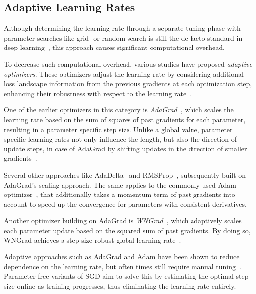 \documentclass[runningheads]{llncs}
\begin{document}
\subsection{Adaptive Learning Rates}

Although determining the learning rate through a separate tuning phase with parameter searches like grid- or random-search is still the de facto standard in deep learning~\cite{defazioLearningRateFreeLearningDAdaptation2023a}, this approach causes significant computational overhead.

To decrease such computational overhead, various studies have proposed \textit{adaptive optimizers}.
These optimizers adjust the learning rate by considering additional loss landscape information from the previous gradients at each optimization step, enhancing their robustness with respect to the learning rate~\cite{duchiAdaptiveSubgradientMethods2011}.

One of the earlier optimizers in this category is \textit{AdaGrad}~\cite{duchiAdaptiveSubgradientMethods2011}, which scales the learning rate based on the sum of squares of past gradients for each parameter, resulting in a parameter specific step size.
Unlike a global value, parameter specific learning rates not only influence the length, but also the direction of update steps, in case of AdaGrad by shifting updates in the direction of smaller gradients~\cite{wuWNGradLearnLearning2020}. %

Several other approaches like AdaDelta~\cite{zeilerADADELTAAdaptiveLearning2012a} and RMSProp~\cite{tielemanLecture5rmspropDivide2012}, subsequently built on AdaGrad's scaling approach.
The same applies to the commonly used Adam optimizer~\cite{kingmaAdamMethodStochastic2017b}, that additionally takes a momentum term of past gradients
into account to speed up the convergence for parameters with consistent derivatives.

Another optimizer building on AdaGrad is \textit{WNGrad}~\cite{wuWNGradLearnLearning2020}, which adaptively scales each parameter update based on the squared sum of past gradients.
By doing so, WNGrad achieves a step size robust global learning rate~\cite{wuWNGradLearnLearning2020}.

Adaptive approaches such as AdaGrad and Adam have been shown to reduce dependence on the learning rate, but often times still require manual tuning~\cite{wuWNGradLearnLearning2020}.
Parameter-free variants of SGD aim to solve this by estimating the optimal step size online as training progresses, thus eliminating the learning rate entirely.
\end{document}
